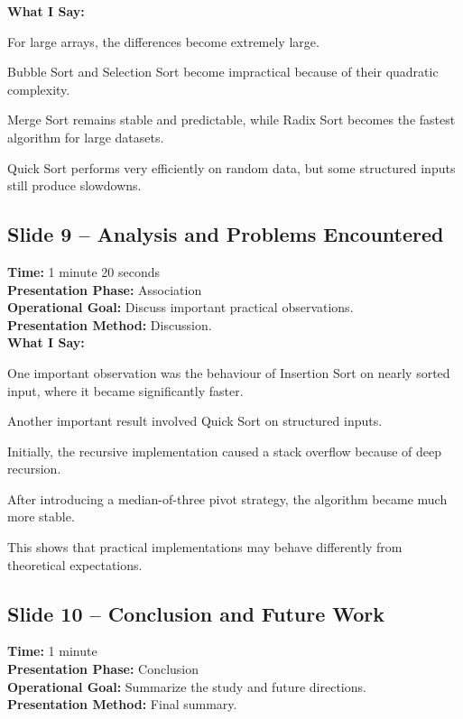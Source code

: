 \documentclass[12pt]{article}
\begin{document}
\textbf{What I Say:}

For large arrays, the differences become extremely large.

Bubble Sort and Selection Sort become impractical because of their quadratic complexity.

Merge Sort remains stable and predictable, while Radix Sort becomes the fastest algorithm for large datasets.

Quick Sort performs very efficiently on random data, but some structured inputs still produce slowdowns.

\vspace{0.4cm}

\subsection*{Slide 9 -- Analysis and Problems Encountered}

\textbf{Time:} 1 minute 20 seconds\\
\textbf{Presentation Phase:} Association\\
\textbf{Operational Goal:} Discuss important practical observations.\\
\textbf{Presentation Method:} Discussion.\\

\textbf{What I Say:}

One important observation was the behaviour of Insertion Sort on nearly sorted input, where it became significantly faster.

Another important result involved Quick Sort on structured inputs.

Initially, the recursive implementation caused a stack overflow because of deep recursion.

After introducing a median-of-three pivot strategy, the algorithm became much more stable.

This shows that practical implementations may behave differently from theoretical expectations.

\vspace{0.4cm}

\subsection*{Slide 10 -- Conclusion and Future Work}

\textbf{Time:} 1 minute\\
\textbf{Presentation Phase:} Conclusion\\
\textbf{Operational Goal:} Summarize the study and future directions.\\
\textbf{Presentation Method:} Final summary.\\
\end{document}
